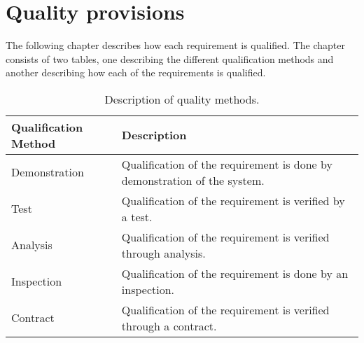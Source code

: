 \chapter{Quality provisions}
The following chapter describes how each requirement is qualified. The chapter consists of two tables, one describing the different qualification methods and another describing how each of the requirements is qualified.\\



\begin{table}[H]
\begin{tabular}{|l|p{9cm}|}
\hline
 \textbf{Qualification Method} & \textbf{Description} \\ \hline
 Demonstration & Qualification of the requirement is done by demonstration of the system. \\  \hline
 Test & Qualification of the requirement is verified by a test. \\  \hline
 Analysis & Qualification of the requirement is verified through analysis.  \\  \hline %
 Inspection & Qualification of the requirement is done by an inspection.  \\  \hline %
 Contract & Qualification of the requirement is verified through a contract. \\ \hline
\end{tabular}
\caption{Description of quality methods.}
\end{table}


\enspace


